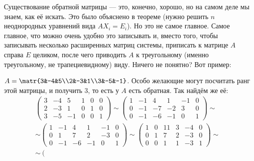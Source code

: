 \documentclass{article}
\begin{document}
\begin{itemize}
\begin{Proof}
        \end{Proof}    
        \begin{Comment}
            Существование обратной матрицы --- это, конечно, хорошо, но на самом деле мы знаем, как её искать. Это было объяснено в теореме (нужно решить $n$ неоднородных уравнений вида $AX_i=E_i$). Но это не самое главное. Самое главное, что можно очень удобно это записывать и, вместо того, чтобы записывать несколько расширенных матриц системы, приписать к матрице $A$ справа $E$ целиком, после чего приводить $A$ к треугольному (именно треугольному, не трапециевидному) виду. Ничего не понятно? Вот пример:
        \end{Comment}
        \begin{Example}
            $A=\matr{3&-4&5\\2&-3&1\\3&-5&-1}$. Особо желающие могут посчитать ранг этой матрицы, и получить 3, то есть у $A$ есть обратная. Так найдём же её:
            \[\begin{gathered}
                \left(\begin{array}{ccc|ccc}
                    3&-4&5 & 1&0&0\\
                    2&-3&1 & 0&1&0\\
                    3&-5&-1 & 0&0&1
                \end{array}\right)\sim
                \left(\begin{array}{ccc|ccc}
                    1&-1&4 & 1&-1&0\\
                    0&-1&-7 & -2&3&0\\
                    0&-1&-6 & -1&0&1
                \end{array}\right)\sim\\\sim
                \left(\begin{array}{ccc|ccc}
                    1&-1&4 & 1&-1&0\\
                    0&1&7 & 2&-3&0\\
                    0&-1&-6 & -1&0&1
                \end{array}\right)\sim
                \left(\begin{array}{ccc|ccc}
                    1&0&11 & 3&-4&0\\
                    0&1&7 & 2&-3&0\\
                    0&0&1 & 1&-3&1
                \end{array}\right)\sim\\\sim
                \left(\begin{array}{ccc|ccc}

\end{array}
\end{gathered}\]
\end{Example}
\end{itemize}
\end{document}
